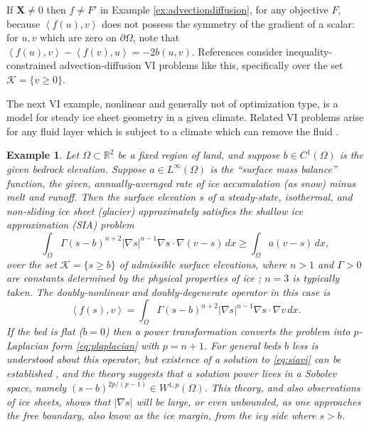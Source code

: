 \documentclass[letterpaper,final,12pt,reqno]{amsart}
\theoremstyle{cstyle}
\theoremstyle{cstyle*}
\theoremstyle{dstyle}
\newtheorem{example}[theorem]{Example}
\numberwithin{equation}{section}
\numberwithin{figure}{section}
\numberwithin{table}{section}
\numberwithin{theorem}{section}
\newcommand{\RR}{\mathbb{R}}
\newcommand{\grad}{\nabla}
\newcommand{\bX}{\mathbf{X}}
\newcommand{\cK}{\mathcal{K}}
\newcommand{\ip}[2]{\left<#1,#2\right>}
\begin{document}
If $\bX \ne 0$ then $f\ne F'$ in Example \ref{ex:advectiondiffusion}, for any objective $F$, because $\ip{f(u)}{v}$ does not possess the symmetry of the gradient of a scalar: for $u,v$ which are zero on $\partial \Omega$, note that $\ip{f(u)}{v} - \ip{f(v)}{u} = -2 b(u,v)$.  References \cite{Bueler2021conservation,ChangNakshatrala2017} consider inequality-constrained advection-diffusion VI problems like this, specifically over the set $\cK = \{v\ge 0\}$.

The next VI example, nonlinear and generally not of optimization type, is a model for steady ice sheet geometry in a given climate.  Related VI problems arise for any fluid layer which is subject to a climate which can remove the fluid \cite{Bueler2021conservation}.

\begin{example}  \label{ex:sia}  Let $\Omega \subset \RR^2$ be a fixed region of land, and suppose $b \in C^1(\Omega)$ is the given bedrock elevation.  Suppose $a \in L^\infty(\Omega)$ is the ``surface mass balance'' function, the given, annually-averaged rate of ice accumulation (as snow) minus melt and runoff.  Then the surface elevation $s$ of a steady-state, isothermal, and non-sliding ice sheet (glacier) approximately satisfies the \emph{shallow ice approximation} (SIA) \cite{GreveBlatter2009} problem
\begin{equation}
\int_\Omega \Gamma (s-b)^{n+2} |\grad s|^{n-1} \grad s \cdot \grad (v-s) \,dx \ge \int_\Omega a (v-s)\,dx, \label{eq:siavi}
\end{equation}
over the set $\mathcal{K} = \{s\ge b\}$ of admissible surface elevations, where $n>1$ and $\Gamma>0$ are constants determined by the physical properties of ice \cite{GreveBlatter2009}; $n=3$ is typically taken.  The doubly-nonlinear and doubly-degenerate operator in this case is
\begin{equation}
\ip{f(s)}{v} = \int_\Omega \Gamma (s-b)^{n+2} |\grad s|^{n-1} \grad s \cdot \grad v\,dx. \label{eq:sia}
\end{equation}
If the bed is flat ($b=0$) then a power transformation converts the problem into $p$-Laplacian form \eqref{eq:plaplacian} with $p=n+1$.  For general beds $b$ less is understood about this operator, but existence of a solution to \eqref{eq:siavi} can be established \cite{JouvetBueler2012}, and the theory suggests that a solution power lives in a Sobolev space, namely $(s-b)^{2p/(p-1)} \in W^{1,p}(\Omega)$.  This theory, and also observations of ice sheets, shows that $|\grad s|$ will be large, or even unbounded, as one approaches the free boundary, also know as the \emph{ice margin}, from the icy side where $s>b$.
\end{example}
\end{document}
